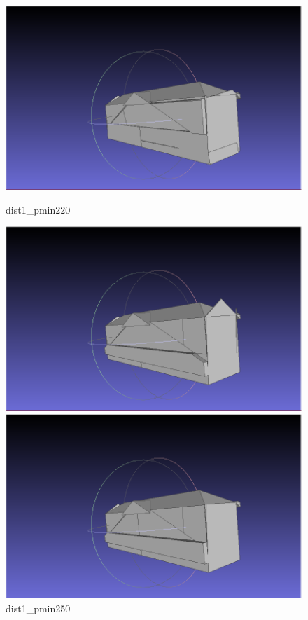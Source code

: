 \documentclass{article}
\begin{document}
\begin{itemize}
\begin{figure}[H]
    \centering
    \begin{minipage}[b]{0.45\textwidth}
      \includegraphics[width=\textwidth]{../../images/screen_kinetic/dist1_pmin220.png}
      \caption{dist1\_pmin220}
      \label{fig:dist1_pmin220}
    \end{minipage}
    \hfill
    \begin{minipage}[b]{0.45\textwidth}
      \includegraphics[width=\textwidth]{../../images/screen_kinetic/dist1_pmin250.png}
      \caption{dist1\_pmin250}
      \label{fig:dist1_pmin250}
    \end{minipage}
    \hfill
    \begin{minipage}[b]{0.45\textwidth}
      \includegraphics[width=\textwidth]{../../images/screen_kinetic/dist1_pmin280.png}

\end{minipage}
\end{figure}
\end{itemize}
\end{document}
